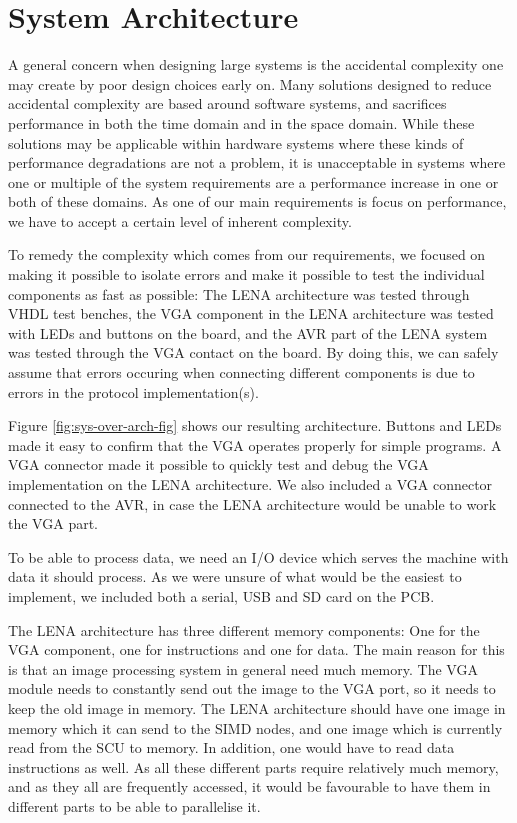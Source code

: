 \section{System Architecture}

A general concern when designing large systems is the accidental
complexity\cite[p.~8-9]{holt2004uml} one may create by poor design choices early
on. Many solutions designed to reduce accidental complexity are based around
software systems, and sacrifices performance in both the time domain and in the
space domain\cite{moseley2006out}. While these solutions may be applicable
within hardware systems where these kinds of performance degradations are not a
problem, it is unacceptable in systems where one or multiple of the system
requirements are a performance increase in one or both of these domains. As one
of our main requirements is focus on performance, we have to accept a certain
level of inherent complexity.



To remedy the complexity which comes from our requirements, we focused on making
it possible to isolate errors and make it possible to test the individual
components as fast as possible: The \ac{LENA} architecture was tested through
\ac{VHDL} test benches, the \ac{VGA} component in the \ac{LENA} architecture was
tested with \acp{LED} and buttons on the board, and the AVR part of the
\ac{LENA} system was tested through the \ac{VGA} contact on the board. By doing
this, we can safely assume that errors occuring when connecting different
components is due to errors in the protocol implementation(s).

Figure \ref{fig:sys-over-arch-fig} shows our resulting architecture. Buttons and
\acp{LED} made it easy to confirm that the \ac{VGA} operates properly for simple
programs. A \ac{VGA} connector made it possible to quickly test and debug the
\ac{VGA} implementation on the \ac{LENA} architecture. We also included a
\ac{VGA} connector connected to the AVR, in case the \ac{LENA} architecture
would be unable to work the \ac{VGA} part.

To be able to process data, we need an \ac{I/O} device which serves the machine
with data it should process. As we were unsure of what would be the easiest to
implement, we included both a serial, \ac{USB} and \ac{SD} card on the \ac{PCB}.

The \ac{LENA} architecture has three different memory components: One for the
\ac{VGA} component, one for instructions and one for data. The main reason for
this is that an image processing system in general need much memory. The
\ac{VGA} module needs to constantly send out the image to the \ac{VGA} port, so
it needs to keep the old image in memory. The \ac{LENA} architecture should have
one image in memory which it can send to the \ac{SIMD} nodes, and one image
which is currently read from the \ac{SCU} to memory. In addition, one would have
to read data instructions as well. As all these different parts require
relatively much memory, and as they all are frequently accessed, it would be
favourable to have them in different parts to be able to parallelise it.
